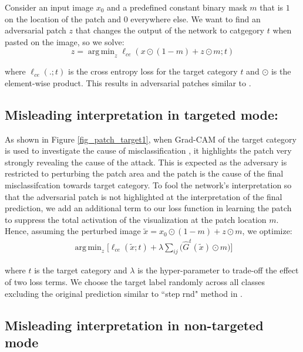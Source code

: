\documentclass[10pt,twocolumn,letterpaper]{article}
\DeclareMathOperator*{\argmin}{arg\,min}
\begin{document}
Consider an input image $x_0$ and a predefined constant binary mask $m$ that is $1$ on the location of the patch and $0$ everywhere else. We want to find an adversarial patch $z$ that changes the output of the network to catgegory $t$ when pasted on the image, so we solve:
$$ z = \argmin_{z} \ell_{ce}(x \odot (1-m)+z \odot m; t)$$

\noindent where $\ell_{ce}(.; t)$ is the cross entropy loss for the target category $t$
and $\odot$ is the element-wise product. This results in adversarial patches similar to \cite{brown2017adversarial}.




\subsection{Misleading interpretation in targeted mode:}
\label{sec:target}
As shown in Figure \ref{fig_patch_target1}, when Grad-CAM of the target category is used to investigate the cause of misclassification  , it highlights the patch very strongly revealing the cause of the attack. This is expected as the adversary is restricted to perturbing the patch area and the patch is the cause of the final misclassifcation towards target category. %
To fool the network's interpretation so that the adversarial patch  is not highlighted at the interpretation of the final prediction, we add an additional term to our loss function in learning the patch to suppress the total activation of the visualization at the patch location $m$. Hence, assuming the perturbed image $\tilde x = x_0 \odot (1-m)+z \odot m$, we optimize:
\begin{equation}
\begin{split}
     \argmin_{z}\Big[\ell_{ce}(\tilde x; t) + \lambda \sum_{ij} \big(\hat{G}^t(\tilde x) \odot m\big)\Big ]
\end{split}
\end{equation}

\noindent where $t$ is the target category and $\lambda$ is the hyper-parameter to trade-off the effect of two loss terms. We choose the target label randomly across all classes excluding the original prediction similar to  ``step rnd" method in \cite{atscale-arxiv-2016}.
\subsection{Misleading interpretation in non-targeted mode}
\end{document}
